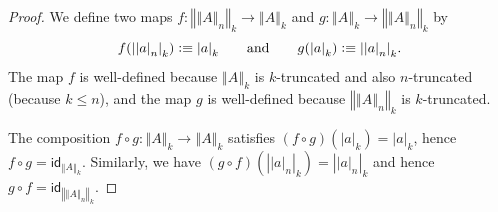 \documentclass[10pt,a4paper]{article}
\newcommand{\defeq}{\vcentcolon\equiv}  %
\newcommand{\idfunc}[1][]{\ensuremath{\mathsf{id}_{#1}}\xspace}
\newcommand{\trunc}[2]{\mathopen{}\left\Vert #2\right\Vert_{#1}\mathclose{}}
\newcommand{\tproj}[3][]{\mathopen{}\left|#3\right|_{#2}^{#1}\mathclose{}}
\theoremstyle{definition}
\theoremstyle{remark}
\numberwithin{equation}{section}
\begin{document}
\begin{proof}
  We define two maps $f:\trunc k{\trunc nA}\to\trunc kA$ and
  $g:\trunc kA\to\trunc k{\trunc nA}$ by
  \[
   f(\tproj k{\tproj na}) \defeq \tproj ka
   \qquad\text{and}\qquad
   g(\tproj ka) \defeq \tproj k{\tproj na}.
  \]
  The map $f$ is well-defined because $\trunc kA$ is $k$-truncated and also
  $n$-truncated (because $k\le{}n$), and the map $g$ is well-defined because
  $\trunc k{\trunc nA}$ is $k$-truncated.

  The composition $f\circ{}g:\trunc kA\to\trunc kA$ satisfies
  $(f\circ{}g)(\tproj ka)=\tproj ka$, hence $f\circ{}g=\idfunc[\trunc kA]$.
  Similarly, we have $(g\circ{}f)(\tproj k{\tproj na})=\tproj k{\tproj na}$ and hence $g\circ{}f=\idfunc[\trunc k{\trunc nA}]$.
\end{proof}
\end{document}
